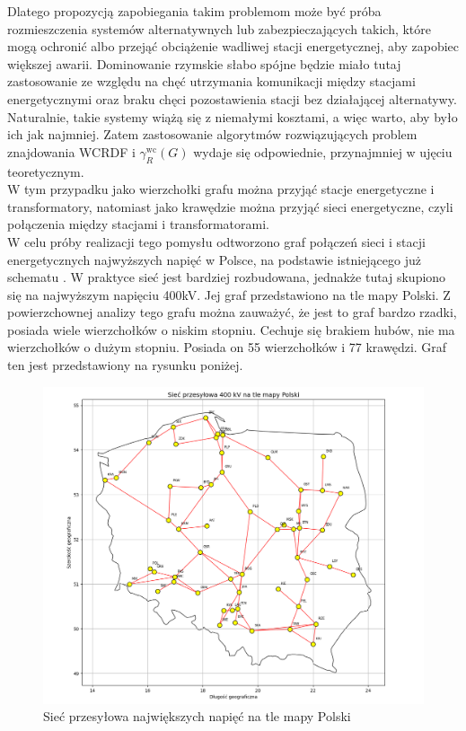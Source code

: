 Dlatego propozycją zapobiegania takim problemom może być próba rozmieszczenia systemów alternatywnych lub zabezpieczających takich, które mogą ochronić albo przejąć obciążenie wadliwej stacji energetycznej, aby zapobiec większej awarii. Dominowanie rzymskie słabo spójne będzie miało tutaj zastosowanie ze względu na chęć utrzymania komunikacji między stacjami energetycznymi oraz braku chęci pozostawienia stacji bez działającej alternatywy. Naturalnie, takie systemy wiążą się z niemałymi kosztami, a więc warto, aby było ich jak najmniej. Zatem zastosowanie algorytmów rozwiązujących problem znajdowania WCRDF i $\gamma^{\text{wc}}_R(G)$ wydaje się odpowiednie, przynajmniej w ujęciu teoretycznym.\\
W tym przypadku jako wierzchołki grafu można przyjąć stacje energetyczne i transformatory, natomiast jako krawędzie można przyjąć sieci energetyczne, czyli połączenia między stacjami i transformatorami.\\
W celu próby realizacji tego pomysłu odtworzono graf połączeń sieci i stacji energetycznych najwyższych napięć w Polsce, na podstawie istniejącego już schematu \cite{POLAND}. W praktyce sieć jest bardziej rozbudowana, jednakże tutaj skupiono się na najwyższym napięciu 400kV. Jej graf przedstawiono na tle mapy Polski. Z powierzchownej analizy tego grafu można zauważyć, że jest to graf bardzo rzadki, posiada wiele wierzchołków o niskim stopniu. Cechuje się brakiem hubów, nie ma wierzchołków o dużym stopniu. Posiada on 55 wierzchołków i 77 krawędzi. Graf ten jest przedstawiony na rysunku poniżej.

\begin{figure}[H]
    \centering
    \includegraphics[width=\textwidth]{assets/Poland/image.png}
    \caption{Sieć przesyłowa największych napięć na tle mapy Polski}
    \label{fig:poland}
\end{figure}

